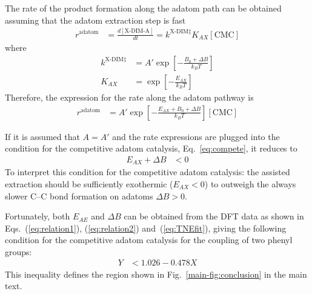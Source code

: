 \documentclass[journal=jpclcd,layout=traditional,manuscript=letter]{achemso} %
\begin{document}
The rate of the product formation along the adatom path can be obtained assuming that the adatom extraction step is fast
%
\begin{equation}
\begin{split}
r^{\text{adatom}} &= \frac{d[\text{X-DIM-A}]}{dt} = k^{\text{X-DIM}\ddagger} K_{AX} [\text{CMC}] 
\end{split}
\end{equation}
%
where
%
\begin{equation}
\begin{split}
k^{\text{X-DIM}\ddagger} &= A' \exp\left[ -\frac{B_0+\Delta B}{k_B T} \right] \\
K_{AX} &= \exp\left[ -\frac{E_{AX}}{k_B T} \right] 
\end{split}
\end{equation}
%
Therefore, the expression for the rate along the adatom pathway is 
%
\begin{equation}
\begin{split}
r^{\text{adatom}} &= A' \exp\left[ -\frac{E_{AX} +B_0+\Delta B}{k_B T} \right] [\text{CMC}] 
\end{split}
\end{equation}
%

If it is assumed that $A=A'$ and the rate expressions are plugged into the condition for the competitive adatom catalysis, Eq.~\ref{eq:compete}, it reduces to
%
\begin{equation}
\begin{split}
E_{AX} + \Delta B &< 0
\end{split}
\end{equation}
%
To interpret this condition for the competitive adatom catalysis: the assisted extraction should be sufficiently exothermic ($E_{AX} < 0$) to outweigh the always slower C--C bond formation on adatoms $\Delta B > 0$.

Fortunately, both $E_{AE}$ and $\Delta B$ can be obtained from the DFT data as shown in Eqs.~(\ref{eq:relation1}), (\ref{eq:relation2}) and~(\ref{eq:TNEfit}), giving the following condition for the competitive adatom catalysis for the coupling of two phenyl groups:
%
\begin{equation}
\begin{split}
Y &< 1.026 - 0.478 X
\end{split}
\end{equation}
%
This inequality defines the region shown in Fig.~\ref{main-fig:conclusion} in the main text.

\fi

%

\end{document}
